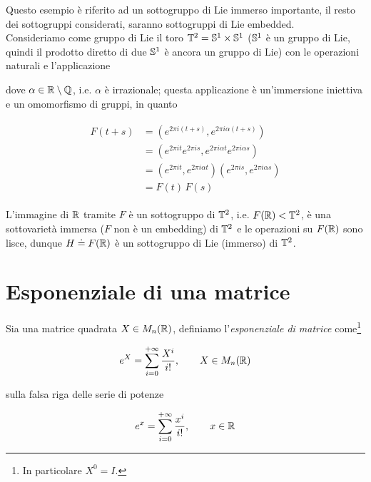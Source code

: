 Questo esempio è riferito ad un sottogruppo di Lie immerso importante, il resto dei sottogruppi considerati, saranno sottogruppi di Lie embedded.\\
Consideriamo come gruppo di Lie il toro $ \T^{2} = \S^{1} \times \S^{1} $ ($ \S^{1} $ è un gruppo di Lie, quindi il prodotto diretto di due $ \S^{1} $ è ancora un gruppo di Lie) con le operazioni naturali e l'applicazione


dove $ \alpha \in \R \setminus \Q $, i.e. $ \alpha $ è irrazionale; questa applicazione è un'immersione iniettiva e un omomorfismo di gruppi, in quanto

\begin{align}
	\begin{split}
		F(t+s) &= (e^{2 \pi i (t+s)},e^{2 \pi i \alpha (t+s)})\\
		&= (e^{2 \pi i t} e^{2 \pi i s},e^{2 \pi i \alpha t} e^{2 \pi i \alpha s})\\
		&= (e^{2 \pi i t},e^{2 \pi i \alpha t}) (e^{2 \pi i s},e^{2 \pi i \alpha s})\\
		&= F(t) \, F(s)
	\end{split}
\end{align}

L'immagine di $ \R $ tramite $ F $ è un sottogruppo di $ \T^{2} $, i.e. $ F(\R) < \T^{2} $, è una sottovarietà immersa ($ F $ non è un embedding) di $ \T^{2} $ e le operazioni su $ F(\R) $ sono lisce, dunque $ H \doteq F(\R) $ è un sottogruppo di Lie (immerso) di $ \T^{2} $.

\section{Esponenziale di una matrice}

Sia una matrice quadrata $ X \in M_{n}(\R) $, definiamo l'\textit{esponenziale di matrice} come\footnote{%
In particolare $ X^{0} = I $.}

\begin{equation}
	e^{X} = \sum_{i=0}^{+\infty} \dfrac{X^{i}}{i!}, \qquad X \in M_{n}(\R)
\end{equation}

sulla falsa riga delle serie di potenze

\begin{equation}
	e^{x} = \sum_{i=0}^{+\infty} \dfrac{x^{i}}{i!}, \qquad x \in \R
\end{equation}

